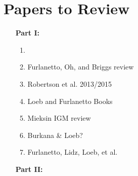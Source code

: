 \documentclass[11pt]{article}
\begin{document}
\section*{Papers to Review}
\begin{enumerate}
\item [{\bf Part I:}]
\begin{enumerate}[-]
\item 
\item Furlanetto, Oh, and Briggs review
\item Robertson et al. 2013/2015
\item Loeb and Furlanetto Books
\item Mieksin IGM review
\item Burkana \& Loeb?
\item Furlanetto, Lidz, Loeb, et al.
\end{enumerate}
\item [{\bf Part II:}] 
\end{enumerate}
\end{document}
